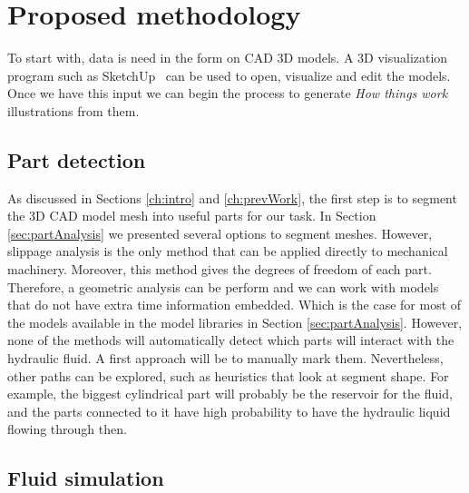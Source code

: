 \chapter{Proposed methodology}

To start with, data is need in the form on CAD 3D models.
A 3D visualization program such as SketchUp~\cite{Trimble2014} can be used to open, visualize and edit the models.
Once we have this input we can begin the process to generate \textit{How things work} illustrations from them.


\section{Part detection}

As discussed in Sections \ref{ch:intro} and \ref{ch:prevWork}, the first step is to segment the 3D CAD model mesh into useful parts for our task.
In Section \ref{sec:partAnalysis} we presented several options to segment meshes.
However, slippage analysis is the only method that can be applied directly to mechanical machinery.
Moreover, this method gives the degrees of freedom of each part. Therefore, a geometric analysis can be perform and we can work with models that do not have extra time information embedded.
Which is the case for most of the models available in the model libraries in Section \ref{sec:partAnalysis}.
However, none of the methods will automatically detect which parts will interact with the hydraulic fluid.
A first approach will be to manually mark them.
Nevertheless, other paths can be explored, such as heuristics that look at segment shape.
For example, the biggest cylindrical part will probably be the reservoir for the fluid, and the parts connected to it have high probability to have the hydraulic liquid flowing through then.


\section{Fluid simulation}

